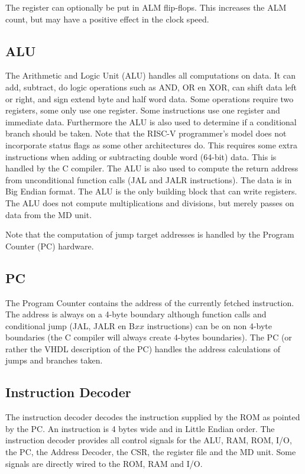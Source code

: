 \documentclass[12pt]{article}
\begin{document}
The register can optionally be put in ALM flip-flops. This increases the ALM count, but may have a positive effect in the clock speed.

\subsection{ALU}
\label{sec:alu}
The Arithmetic and Logic Unit (ALU) handles all computations on data. It can add, subtract, do logic operations such as AND, OR en XOR, can shift data left or right, and sign extend byte and half word data. Some operations require two registers, some only use one register. Some instructions use one register and immediate data. Furthermore the ALU is also used to determine if a conditional branch should be taken. Note that the RISC-V programmer's model does not incorporate status flags as some other architectures do. This requires some extra instructions when adding or subtracting double word (64-bit) data. This is handled by the C compiler. The ALU is also used to compute the return address from unconditional function calls (JAL and JALR instructions). The data is in Big Endian format. The ALU is the only building block that can write registers. The ALU does not compute multiplications and divisions, but merely passes on data from the MD unit.

Note that the computation of jump target addresses is handled by the Program Counter (PC) hardware.

\subsection{PC}
\label{sec:pc}
The Program Counter contains the address of the currently fetched instruction. The address is always on a 4-byte boundary although function calls and conditional jump (JAL, JALR en B$xx$ instructions) can be on non 4-byte boundaries (the C compiler will always create 4-bytes boundaries). The PC (or rather the VHDL description of the PC) handles the address calculations of jumps and branches taken.

\subsection{Instruction Decoder}
\label{sec:instructiondecoder}
The instruction decoder decodes the instruction supplied by the ROM as pointed by the PC. An instruction is 4 bytes wide and in Little Endian order. The instruction decoder provides all control signals for the ALU, RAM, ROM, I/O, the PC, the Address Decoder, the CSR, the register file and the MD unit. Some signals are directly wired to the ROM, RAM and I/O.
\end{document}
